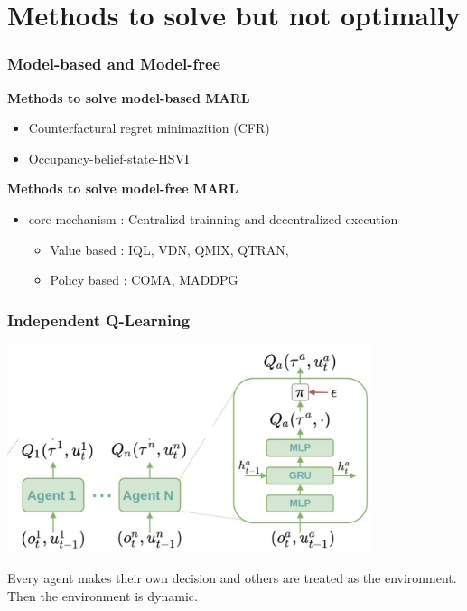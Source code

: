 \documentclass[notheorems, aspectratio=54]{beamer}
\begin{document}
\section{Methods to solve but not optimally}
\begin{frame}
  \frametitle{Model-based and Model-free}
  \textbf{Methods to solve model-based MARL}
  \begin{itemize}
    \item Counterfactural regret minimazition (CFR)
    \item Occupancy-belief-state-HSVI 
  \end{itemize}
  
  \textbf{Methods to solve model-free MARL}
    \begin{itemize}
      \item[] core mechanism : Centralizd trainning and decentralized execution
      \begin{itemize}
        \item Value based : IQL, VDN, QMIX, QTRAN,  
        \item Policy based : COMA, MADDPG
      \end{itemize}
    \end{itemize}

\end{frame}

\begin{frame}
  \frametitle{Independent Q-Learning}
  \begin{center}
    \includegraphics[width=0.8\textwidth]{IQL.png}
  \end{center}
  Every agent makes their own decision and others are treated as the environment. Then the environment is dynamic.
\end{frame}
\end{document}
